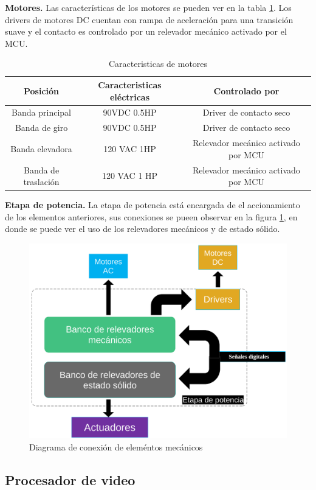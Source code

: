 \documentclass[twoside,spanish,ESP,MSc]{plantillaLabUPV}
\theoremstyle{definition}
\begin{document}
\checkmark\textbf{Motores.} Las características de los motores se pueden ver en la tabla \ref{motorestab}. Los drivers de motores DC cuentan con rampa de aceleración para una transición suave y el contacto es controlado por un relevador mecánico activado por el MCU.

\begin{table}
	\caption{Caracteristicas de motores}
	\label{motorestab}
\begin{tabular}{ccc}
	\textbf{Posición} & \textbf{Caracteristicas eléctricas} & \textbf{Controlado por} \\ 
	\hline 
	Banda principal & 90VDC 0.5HP & Driver de contacto seco \\ 
	\hline 
	Banda de giro & 90VDC 0.5HP & Driver de contacto seco \\ 
	\hline 
	Banda elevadora & 120 VAC 1HP & Relevador mecánico activado por MCU \\ 
	\hline 
	Banda de traslación & 120 VAC 1 HP & Relevador mecánico activado por MCU\\ 
\end{tabular} 
\end{table}




\checkmark\textbf{Etapa de potencia.} La etapa de  potencia está encargada de el accionamiento de los elementos anteriores, sus conexiones se pueen observar en la figura \ref{fig:etapapotencia}, en donde se puede ver el uso de los relevadores mecánicos y de estado sólido.

\begin{figure}
	\centering
	\includegraphics[width=0.7\linewidth]{edrawimas/etapapotencia}
	\caption{Diagrama de conexión de eleméntos mecánicos}
	\label{fig:etapapotencia}
\end{figure}


\subsection{Procesador de video}
\end{document}
